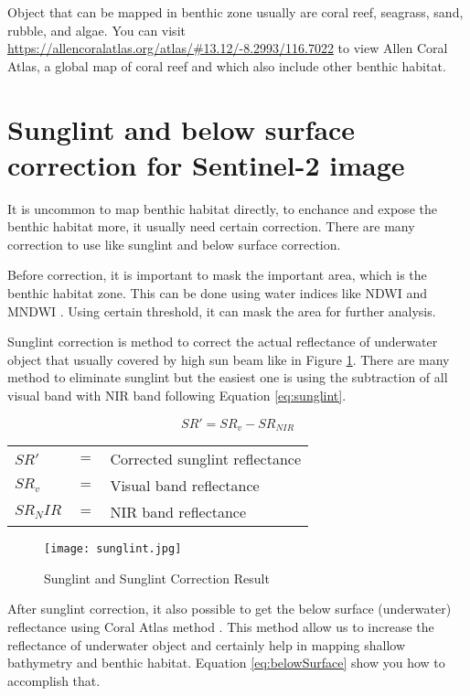 Object that can be mapped in benthic zone usually are coral reef, seagrass, sand, rubble, and algae. You can visit \url{https://allencoralatlas.org/atlas/#13.12/-8.2993/116.7022} to view Allen Coral Atlas, a global map of coral reef and which also include other benthic habitat.

\section{Sunglint and below surface correction for Sentinel-2 image}
It is uncommon to map benthic habitat directly, to enchance and expose the benthic habitat more, it usually need certain correction. There are many correction to use like sunglint and below surface correction.

Before correction, it is important to mask the important area, which is the benthic habitat zone. This can be done using water indices like NDWI and MNDWI \cite{gao1995normalized}. Using certain threshold, it can mask the area for further analysis.

Sunglint correction is method to correct the actual reflectance of underwater object that usually covered by high sun beam like in Figure \ref{fig:sunglint}. There are many method to eliminate sunglint but the easiest one is using the subtraction of all visual band with NIR band following Equation \ref{eq:sunglint}.

\begin{equation}
	\label{eq:sunglint}
	SR' = SR_v - SR_{NIR}
\end{equation}

\begin{tabular}{l l l}
	$SR'$ & $=$ & Corrected sunglint reflectance \\
	$SR_v$ & $=$ & Visual band reflectance \\
	$SR_NIR$ & $=$ & NIR band reflectance \\
\end{tabular}

\begin{figure}[htbp]
	\label{fig:sunglint}
	\centering
	\texttt{[image: sunglint.jpg]}
	\caption{Sunglint and Sunglint Correction Result \cite{hedley2005simple}}
\end{figure}

After sunglint correction, it also possible to get the below surface (underwater) reflectance using Coral Atlas method \cite{li2019adaptive}. This method allow us to increase the reflectance of underwater object and certainly help in mapping shallow bathymetry and benthic habitat. Equation \ref{eq:belowSurface} show you how to accomplish that.

